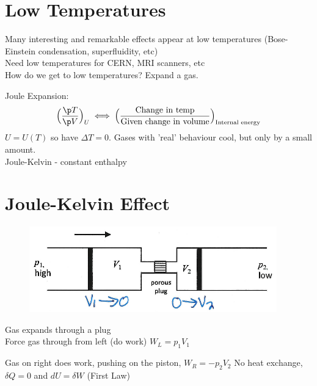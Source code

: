 \documentclass[a4paper, 11pt, normalem]{report}
\begin{document}
\section{Low Temperatures}
Many interesting and remarkable effects appear at low temperatures (Bose-Einstein condensation, superfluidity, etc) \\
Need low temperatures for CERN, MRI scanners, etc \\
How do we get to low temperatures? Expand a gas.

Joule Expansion:
\begin{equation*}
    \Big(\frac{\p T}{\p V}\Big)_U \iff \Big(\frac{\text{Change in temp}}{\text{Given change in volume}}\Big)_{\text{Internal energy}}
\end{equation*}
$U = U(T)$ so have $\Delta T = 0$. Gases with 'real' behaviour cool, but only by a small amount. \\
Joule-Kelvin - constant enthalpy

\section{Joule-Kelvin Effect}
\begin{figure}
    \begin{center}
        \vspace{-20pt}
        \includegraphics[scale=0.45]{JouleKelvin1.png}
        \vspace{-40pt}
    \end{center}
\end{figure}

Gas expands through a plug \\
Force gas through from left (do work) $W_L = p_1 V_1$

Gas on right does work, pushing on the piston, $W_R = -p_2 V_2$
No heat exchange, $\delta Q = 0$ and $dU = \delta W$ (First Law)
\end{document}
